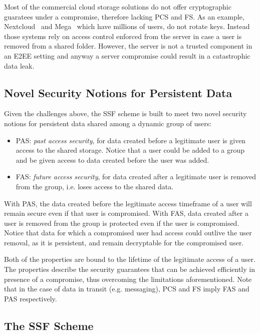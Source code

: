 Most of the commercial cloud storage solutions do not offer cryptographic guaratees under a compromise,
therefore lacking PCS and FS. As an example, Nextcloud~\cite{2017NextcloudE2EEnc} and Mega~\cite{Mega}
which have millions of users, do not rotate keys. 
Instead those systems rely on access control enforced from the server
in case a user is removed from a shared folder.
However, the server is not a trusted component in an E2EE setting
and anyway a server compromise could result in a catastrophic data leak.

\subsection{Novel Security Notions for Persistent Data}

Given the challenges above, the SSF scheme is built to meet two 
novel security notions for persistent data shared among a dynamic 
group of users:
\begin{itemize}
    \item PAS: \textit{past access security}, for data created before a legitimate user is given access to the shared storage. Notice that a user could be added to a group and be given access to data created before the user was added.
    \item FAS: \textit{future access security}, for data created after a legitimate user is removed from the group, i.e. loses access to the shared data.
\end{itemize}

With PAS, the data created before the legitimate access timeframe of a user
will remain secure even if that user is compromised.
With FAS, data created after a user is removed from the group is protected
even if the user is compromised. Notice that data for which 
a compromised user had access could outlive the user removal,
as it is persistent, and remain decryptable for the compromised user.

Both of the properties are bound to the lifetime of the legitimate access 
of a user.
The properties describe the security guarantees that can be achieved efficiently
in presence of a compromise,
thus overcoming the limitations aforementioned.
Note that in the case of data in transit (e.g. messaging),
PCS and FS imply FAS and PAS respectively.

\subsection{The SSF Scheme}

